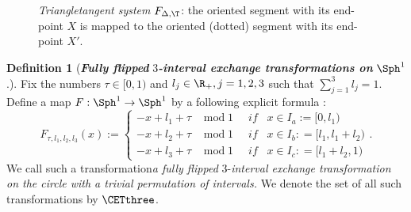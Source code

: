 \documentclass[12pt]{article}
\theoremstyle{definition}
\newtheorem{definition}{Definition}
\begin{document}
\begin{figure}
\centering
{}   
\caption[]{\emph{Triangletangent system} $F_{\Delta, \T}$: the oriented segment with its end-point $X$ is mapped to the oriented (dotted) segment with its end-point $X'$.}\label{fig:triangletangent}
\end{figure}

\begin{definition}[\textbf{\emph{Fully flipped  }}$3$\emph{\textbf{-interval exchange transformations on }}$\Sph^1$.]\label{def:fully_flpped_3_interval_exchange_transformations_on_the_circle:4}
Fix the numbers $\tau \in [0,1)$ and $l_j \in \R_+, j=1,2,3$ such that $\sum_{j=1}^3 l_j=1$. Define a map $F: \Sph^1 \rightarrow \Sph^1$ by a following explicit formula : 
\begin{equation*}
F_{\tau, l_1, l_2, l_3}(x):=
  \begin{cases}
 -x+l_1+\tau \; \; \; \; \mathrm{mod} \; 1 & \; \; \textit{if}  \; \; \; x \in I_a:= [0,l_1) \\
      -x+l_2 +\tau   \; \; \; \; \mathrm{mod}\;  1  & \; \; \textit{if} \; \; \; x \in I_b: = [l_1, l_1+l_2)\\
      -x+l_3 +\tau  \; \; \; \; \mathrm{mod}\;  1 & \; \; \textit{if} \; \; \; x \in I_c: =[l_1+l_2,1)
    \end{cases}.
\end{equation*}
We call such a transformation\emph{a fully flipped }$3$-\emph{interval exchange transformation on the circle with a trivial permutation of intervals.} We denote the set of all such transformations by $\CETthree$.
\end{definition}
\end{document}
